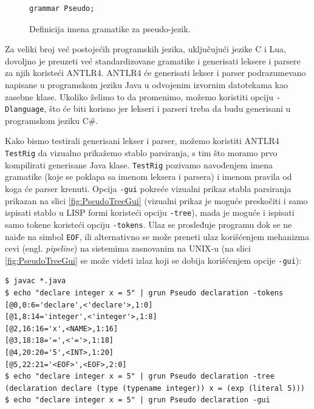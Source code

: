\begin{figure}[h!]
\begin{lstlisting}[language={}]
grammar Pseudo;
\end{lstlisting}
\caption{Definicija imena gramatike za pseudo-jezik.}
\label{fig:PseudoDef9}
\end{figure}


Za veliki broj već postojećih programskih jezika, uključujući jezike C i Lua, dovoljno je preuzeti već standardizovane gramatike i generisati leksere i parsere za njih koristeći ANTLR4. ANTLR4 će generisati lekser i parser podrazumevano napisane u programskom jeziku Java u odvojenim izvornim datotekama kao zasebne klase. Ukoliko želimo to da promenimo, možemo koristiti opciju \texttt{-Dlanguage}, što će biti korisno jer lekseri i parseri treba da budu generisani u programskom jeziku C\#.

Kako bismo testirali generisani lekser i parser, možemo koristiti ANTLR4 \texttt{TestRig} da vizualno prikažemo stablo parsiranja, s tim što moramo prvo kompilirati generisane Java klase. \texttt{TestRig} pozivamo navođenjem imena gramatike (koje se poklapa sa imenom leksera i parsera) i imenom pravila od koga će parser krenuti. Opcija \texttt{-gui} pokreće vizualni prikaz stabla parsiranja prikazan na slici \ref{fig:PseudoTreeGui} (vizualni prikaz je moguće preskočiti i samo ispisati stablo u LISP formi koristeći opciju \texttt{-tree}), mada je moguće i ispisati samo tokene koristeći opciju \texttt{-tokens}. Ulaz se prosleđuje programu dok se ne naiđe na simbol \texttt{EOF}, ili alternativno se može preneti ulaz korišćenjem mehanizma cevi (engl. \emph{pipeline}) na sistemima zasnovanim na UNIX-u (na slici \ref{fig:PseudoTreeGui} se može videti izlaz koji se dobija korišćenjem opcije \texttt{-gui}):
\begin{lstlisting}[language={}]
$ javac *.java
$ echo "declare integer x = 5" | grun Pseudo declaration -tokens
[@0,0:6='declare',<'declare'>,1:0]
[@1,8:14='integer',<'integer'>,1:8]
[@2,16:16='x',<NAME>,1:16]
[@3,18:18='=',<'='>,1:18]
[@4,20:20='5',<INT>,1:20]
[@5,22:21='<EOF>',<EOF>,2:0]
$ echo "declare integer x = 5" | grun Pseudo declaration -tree
(declaration declare (type (typename integer)) x = (exp (literal 5)))
$ echo "declare integer x = 5" | grun Pseudo declaration -gui
\end{lstlisting}    

